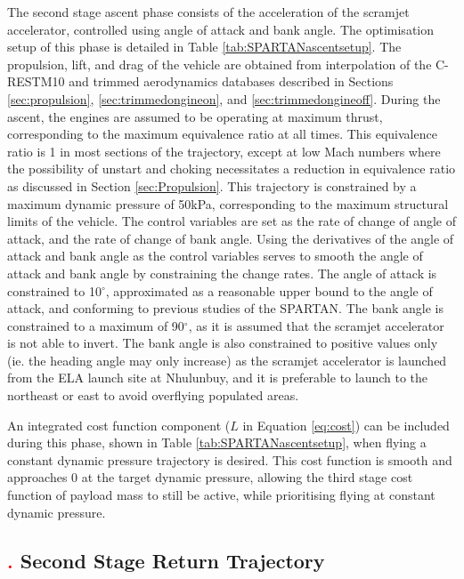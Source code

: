 The second stage ascent phase consists of the acceleration of the scramjet accelerator, controlled using angle of attack and bank angle. The optimisation setup of this phase is detailed in Table \ref{tab:SPARTANascentsetup}.
The propulsion, lift, and drag of the vehicle are obtained from interpolation of the C-RESTM10 and trimmed aerodynamics databases described in Sections \ref{sec:propulsion}, \ref{sec:trimmedongineon}, and \ref{sec:trimmedongineoff}. 
During the ascent, the engines are assumed to be operating at maximum thrust, corresponding to the maximum equivalence ratio at all times. This equivalence ratio is 1 in most sections of the trajectory, except at low Mach numbers where the possibility of unstart and choking necessitates a reduction in equivalence ratio as discussed in Section \ref{sec:Propulsion}. This trajectory is constrained by a maximum dynamic pressure of 50kPa, corresponding to the maximum structural limits of the vehicle. 
The control variables are set as the rate of change of angle of attack, and the rate of change of bank angle. Using the derivatives of the angle of attack and bank angle as the control variables serves to smooth the angle of attack and bank angle by constraining the change rates. The angle of attack is constrained to 10$^\circ$, approximated as a reasonable upper bound to the angle of attack, and conforming to previous studies of the SPARTAN. The bank angle is constrained to a maximum of 90$^\circ$, as it is assumed that the scramjet accelerator is not able to invert. The bank angle is also constrained to positive values only (ie. the heading angle may only increase) as the scramjet accelerator is launched from the ELA launch site at Nhulunbuy, and it is preferable to launch to the northeast or east to avoid overflying populated areas. 

An integrated cost function component ($L$ in Equation \ref{eq:cost}) can be included during this phase, shown in Table \ref{tab:SPARTANascentsetup}, when flying a constant dynamic pressure trajectory is desired. This cost function is smooth and approaches 0 at the target dynamic pressure, allowing the third stage cost function of payload mass to still be active, while prioritising flying at constant dynamic pressure. 


\subsection{\textcolor{red}{.} Second Stage Return Trajectory}


